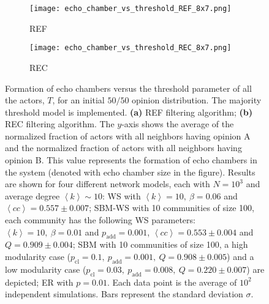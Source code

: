 \documentclass[11 pt , letterpaper , twoside , openright]{book}
\begin{document}
\begin{figure}[H]
  \begin{subfigure}[b]{0.49\textwidth}
    \caption{REF}
  	\texttt{[image: echo\_chamber\_vs\_threshold\_REF\_8x7.png]}
    \label{REF_thres}
  \end{subfigure}
  \begin{subfigure}[b]{0.49\textwidth}
    \caption{REC}
  	\texttt{[image: echo\_chamber\_vs\_threshold\_REC\_8x7.png]}
    \label{REC_thres}
  \end{subfigure}
  \captionsetup{format=plain}
  \caption[Formation of echo chambers versus the threshold parameter of all the actors, $T$, for the REF and REC filtering algorithms and an initial $50/50$ opinion distribution. The majority threshold model is implemented.]{Formation of echo chambers versus the threshold parameter of all the actors, $T$, for an initial $50/50$ opinion distribution. The majority threshold model is implemented. \textbf{(a)} REF filtering algorithm; \textbf{(b)} REC filtering algorithm. The $y$-axis shows the average of the normalized fraction of actors with all neighbors having opinion A and the normalized fraction of actors with all neighbors having opinion B. This value represents the formation of echo chambers in the system (denoted with echo chamber size in the figure). Results are shown for four different network models, each with $N=10^3$ and average degree $\left<k\right> \sim 10$: WS with $\left<k\right> =10,\ \beta = 0.06$ and $\left<cc\right> = 0.557 \pm 0.007$; SBM-WS with 10 communities of size 100, each community has the following WS parameters: $\left<k\right> = 10,\ \beta = 0.01$ and $p_{\text{add}} = 0.001$, $\left<cc\right> = 0.553 \pm 0.004$ and $Q = 0.909 \pm 0.004$; SBM with 10 communities of size 100, a high modularity case ($p_{\text{cl}} = 0.1,\ p_{\text{add}} = 0.001,\ Q = 0.908 \pm 0.005$) and a low modularity case ($p_{\text{cl}} = 0.03,\ p_{\text{add}} = 0.008,\ Q = 0.220 \pm 0.007$) are depicted; ER with $p= 0.01$. Each data point is the average of $10^2$ independent simulations. Bars represent the standard deviation $\sigma$.}
\label{echo_vs_threshold_REF-REC}
\end{figure}
\noindent
\end{document}
